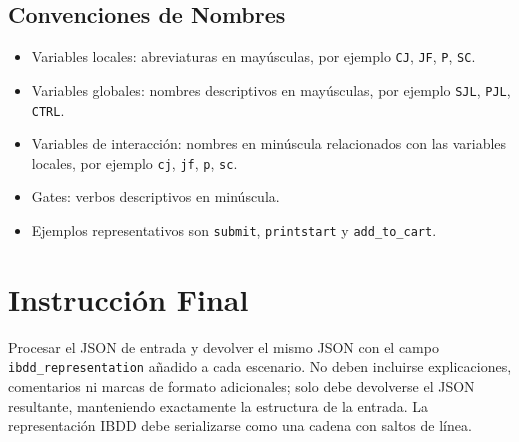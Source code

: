 \subsection{Convenciones de Nombres}

\begin{itemize}
\item Variables locales: abreviaturas en mayúsculas, por ejemplo \texttt{CJ}, \texttt{JF}, \texttt{P}, \texttt{SC}.
\item Variables globales: nombres descriptivos en mayúsculas, por ejemplo \texttt{SJL}, \texttt{PJL}, \texttt{CTRL}.
\item Variables de interacción: nombres en minúscula relacionados con las variables locales, por ejemplo \texttt{cj}, \texttt{jf}, \texttt{p}, \texttt{sc}.
\item Gates: verbos descriptivos en minúscula.
\item Ejemplos representativos son \texttt{submit}, \texttt{printstart} y \texttt{add\_to\_cart}.
\end{itemize}

\section{Instrucción Final}

Procesar el JSON de entrada y devolver el mismo JSON con el campo \texttt{ibdd\_representation} añadido a cada escenario. No deben incluirse explicaciones, comentarios ni marcas de formato adicionales; solo debe devolverse el JSON resultante, manteniendo exactamente la estructura de la entrada. La representación IBDD debe serializarse como una cadena con saltos de línea.
\endgroup
